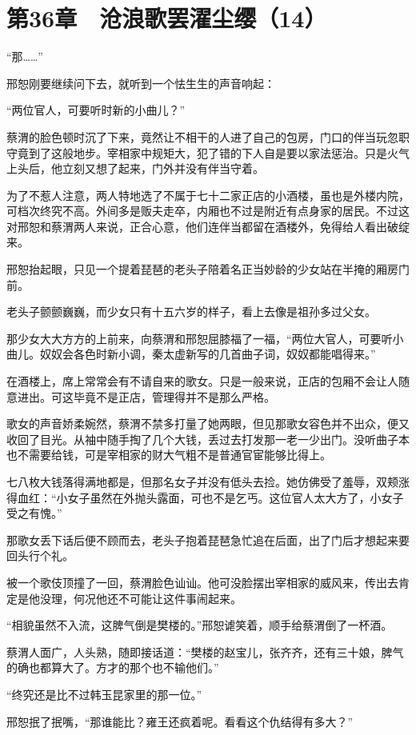 \section{第36章　沧浪歌罢濯尘缨（14）}

“那……”

邢恕刚要继续问下去，就听到一个怯生生的声音响起：

“两位官人，可要听时新的小曲儿？”

蔡渭的脸色顿时沉了下来，竟然让不相干的人进了自己的包房，门口的伴当玩忽职守竟到了这般地步。宰相家中规矩大，犯了错的下人自是要以家法惩治。只是火气上头后，他立刻又想了起来，门外并没有伴当守着。

为了不惹人注意，两人特地选了不属于七十二家正店的小酒楼，虽也是外楼内院，可档次终究不高。外间多是贩夫走卒，内厢也不过是附近有点身家的居民。不过这对邢恕和蔡渭两人来说，正合心意，他们连伴当都留在酒楼外，免得给人看出破绽来。

邢恕抬起眼，只见一个提着琵琶的老头子陪着名正当妙龄的少女站在半掩的厢房门前。

老头子颤颤巍巍，而少女只有十五六岁的样子，看上去像是祖孙多过父女。

那少女大大方方的上前来，向蔡渭和邢恕屈膝福了一福，“两位大官人，可要听小曲儿。奴奴会各色时新小调，秦太虚新写的几首曲子词，奴奴都能唱得来。”

在酒楼上，席上常常会有不请自来的歌女。只是一般来说，正店的包厢不会让人随意进出。可这毕竟不是正店，管理得并不是那么严格。

歌女的声音娇柔婉然，蔡渭不禁多打量了她两眼，但见那歌女容色并不出众，便又收回了目光。从袖中随手掏了几个大钱，丢过去打发那一老一少出门。没听曲子本也不需要给钱，可是宰相家的财大气粗不是普通官宦能够比得上。

七八枚大钱落得满地都是，但那名女子并没有低头去捡。她仿佛受了羞辱，双颊涨得血红：“小女子虽然在外抛头露面，可也不是乞丐。这位官人太大方了，小女子受之有愧。”

那歌女丢下话后便不顾而去，老头子抱着琵琶急忙追在后面，出了门后才想起来要回头行个礼。

被一个歌伎顶撞了一回，蔡渭脸色讪讪。他可没脸摆出宰相家的威风来，传出去肯定是他没理，何况他还不可能让这件事闹起来。

“相貌虽然不入流，这脾气倒是樊楼的。”邢恕谑笑着，顺手给蔡渭倒了一杯酒。

蔡渭人面广，人头熟，随即接话道：“樊楼的赵宝儿，张齐齐，还有三十娘，脾气的确也都算大了。方才的那个也不输他们。”

“终究还是比不过韩玉昆家里的那一位。”

邢恕抿了抿嘴，“那谁能比？雍王还疯着呢。看看这个仇结得有多大？”

